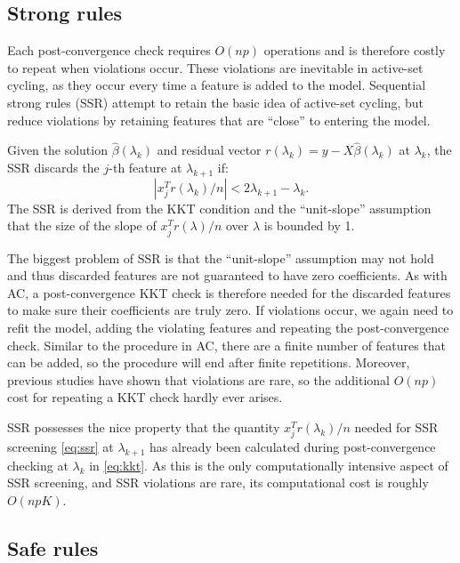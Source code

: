 \subsection{Strong rules}

Each post-convergence check requires $O(np)$ operations and is therefore costly to repeat when violations occur.  These violations are inevitable in active-set cycling, as they occur every time a feature is added to the model.  Sequential strong rules (SSR) \citep{tibshirani2011regression} attempt to retain the basic idea of active-set cycling, but reduce violations by retaining features that are ``close'' to entering the model.

Given the solution $\hat{\beta}(\lambda_k)$ and residual vector $r(\lambda_k)=y-X\hat{\beta}(\lambda_k)$ at $\lambda_k$, the SSR discards the $j$-th feature at $\lambda_{k+1}$ if:
\begin{equation}
  \label{eq:ssr}
  |x_j^Tr(\lambda_k)/n|<2\lambda_{k+1}-\lambda_k.
\end{equation}
The SSR is derived from the KKT condition and the ``unit-slope'' assumption that the size of the slope of $x_j^Tr(\lambda)/n$ over $\lambda$ is bounded by 1. 

The biggest problem of SSR is that the ``unit-slope'' assumption may not hold and thus discarded features are not guaranteed to have zero coefficients. As with AC, a post-convergence KKT check is therefore needed for the discarded features to make sure their coefficients are truly zero. If violations occur, we again need to refit the model, adding the violating features and repeating the post-convergence check. Similar to the procedure in AC, there are a finite number of features that can be added, so the procedure will end after finite repetitions. Moreover, previous studies have shown that violations are rare, so the additional $O(np)$ cost for repeating a KKT check hardly ever arises.

SSR possesses the nice property that the quantity $x_j^Tr(\lambda_k)/n$ needed for SSR screening \eqref{eq:ssr} at $\lambda_{k+1}$ has already been calculated during post-convergence checking at $\lambda_k$ in \eqref{eq:kkt}. As this is the only computationally intensive aspect of SSR screening, and SSR violations are rare, its computational cost is roughly $O(npK)$.

\subsection{Safe rules}
\label{sec:safe}

